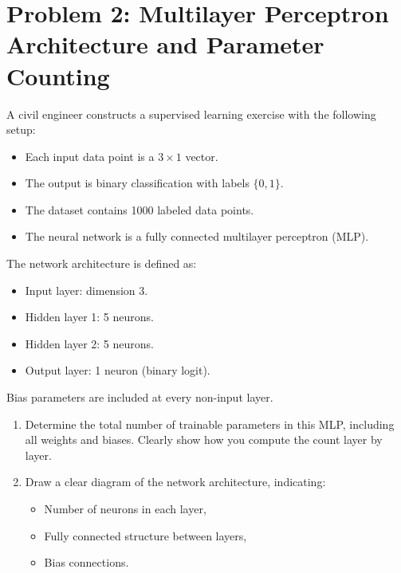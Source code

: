 \documentclass[12pt]{article}
\begin{document}
\newpage
\section*{Problem 2: Multilayer Perceptron Architecture and Parameter Counting}

A civil engineer constructs a supervised learning exercise with the following setup:

\begin{itemize}
  \item Each input data point is a \( 3 \times 1 \) vector.
  \item The output is binary classification with labels \( \{0,1\} \).
  \item The dataset contains 1000 labeled data points.
  \item The neural network is a fully connected multilayer perceptron (MLP).
\end{itemize}

The network architecture is defined as:

\begin{itemize}
  \item Input layer: dimension 3.
  \item Hidden layer 1: 5 neurons.
  \item Hidden layer 2: 5 neurons.
  \item Output layer: 1 neuron (binary logit).
\end{itemize}

Bias parameters are included at every non-input layer.

\begin{enumerate}
  \item Determine the total number of trainable parameters in this MLP, including all weights and biases. Clearly show how you compute the count layer by layer.

  \item Draw a clear diagram of the network architecture, indicating:
    \begin{itemize}
      \item Number of neurons in each layer,
      \item Fully connected structure between layers,
      \item Bias connections.
    \end{itemize}
\end{enumerate}

\newpage
\end{document}
